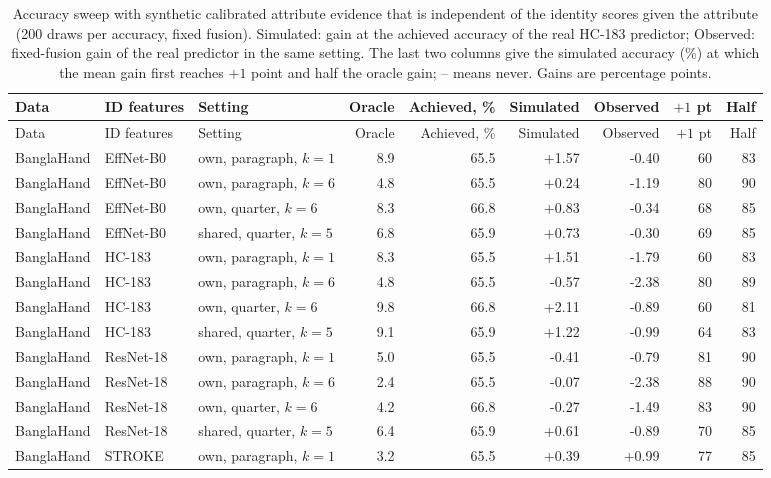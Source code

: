 {\footnotesize\setlength{\tabcolsep}{2.6pt}
\begin{longtable}{lllrrrrrr}
\caption{Accuracy sweep with synthetic calibrated attribute evidence that is independent of the identity scores given the attribute (200 draws per accuracy, fixed fusion). Simulated: gain at the achieved accuracy of the real HC-183 predictor; Observed: fixed-fusion gain of the real predictor in the same setting. The last two columns give the simulated accuracy (\%) at which the mean gain first reaches $+1$ point and half the oracle gain; -- means never. Gains are percentage points.}\label{tab:sweep}\\
\toprule Data & ID features & Setting & Oracle & Achieved, \% & Simulated & Observed & $+1$ pt & Half\\\midrule
\endfirsthead
\toprule Data & ID features & Setting & Oracle & Achieved, \% & Simulated & Observed & $+1$ pt & Half\\\midrule
\endhead
BanglaHand & EffNet-B0 & own, paragraph, $k=1$ & 8.9 & 65.5 & +1.57 & -0.40 & 60 & 83 \\
BanglaHand & EffNet-B0 & own, paragraph, $k=6$ & 4.8 & 65.5 & +0.24 & -1.19 & 80 & 90 \\
BanglaHand & EffNet-B0 & own, quarter, $k=6$ & 8.3 & 66.8 & +0.83 & -0.34 & 68 & 85 \\
BanglaHand & EffNet-B0 & shared, quarter, $k=5$ & 6.8 & 65.9 & +0.73 & -0.30 & 69 & 85 \\
BanglaHand & HC-183 & own, paragraph, $k=1$ & 8.3 & 65.5 & +1.51 & -1.79 & 60 & 83 \\
BanglaHand & HC-183 & own, paragraph, $k=6$ & 4.8 & 65.5 & -0.57 & -2.38 & 80 & 89 \\
BanglaHand & HC-183 & own, quarter, $k=6$ & 9.8 & 66.8 & +2.11 & -0.89 & 60 & 81 \\
BanglaHand & HC-183 & shared, quarter, $k=5$ & 9.1 & 65.9 & +1.22 & -0.99 & 64 & 83 \\
BanglaHand & ResNet-18 & own, paragraph, $k=1$ & 5.0 & 65.5 & -0.41 & -0.79 & 81 & 90 \\
BanglaHand & ResNet-18 & own, paragraph, $k=6$ & 2.4 & 65.5 & -0.07 & -2.38 & 88 & 90 \\
BanglaHand & ResNet-18 & own, quarter, $k=6$ & 4.2 & 66.8 & -0.27 & -1.49 & 83 & 90 \\
BanglaHand & ResNet-18 & shared, quarter, $k=5$ & 6.4 & 65.9 & +0.61 & -0.89 & 70 & 85 \\
BanglaHand & STROKE & own, paragraph, $k=1$ & 3.2 & 65.5 & +0.39 & +0.99 & 77 & 85 \\

\end{longtable}}
